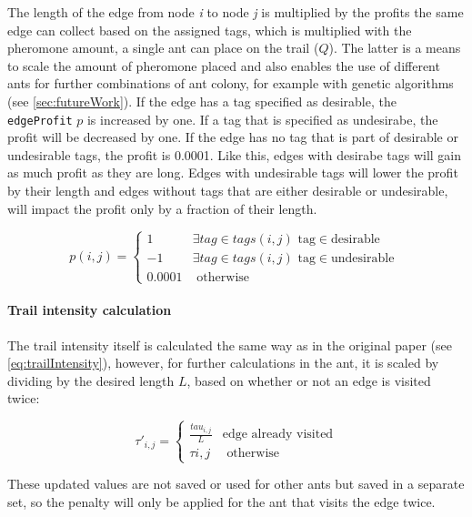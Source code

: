 The length of the edge from node \textit{i} to node \textit{j} is multiplied by the profits the same edge can collect based on the assigned tags, which is multiplied with the pheromone amount, a single ant can place on the trail ($Q$).
The latter is a means to scale the amount of pheromone placed and also enables the use of different ants for further combinations of ant colony, for example with genetic algorithms (see \ref{sec:futureWork}).
If the edge has a tag specified as desirable, the \texttt{edgeProfit} $p$ is increased by one.
If a tag that is specified as undesirabe, the profit will be decreased by one.
If the edge has no tag that is part of desirable or undesirable tags, the profit is 0.0001.
Like this, edges with desirabe tags will gain as much profit as they are long. 
Edges with undesirable tags will lower the profit by their length and edges without tags that are either desirable or undesirable, will impact the profit only by a fraction of their length.

\begin{equation}
	\label{eq:newProfitCalc}
	p(i,j) = \begin{cases}
		1 &\exists tag \in tags(i,j) \text{ tag} \in \text{desirable }\\
		-1 &\exists tag \in tags(i,j) \text{ tag} \in \text{undesirable }\\
		0.0001 &\text{ otherwise}
	\end{cases}
\end{equation}

\paragraph{Trail intensity calculation}

The trail intensity itself is calculated the same way as in the original paper (see \ref{eq:trailIntensity}), however, for further calculations in the ant, it is scaled by dividing by the desired length $L$, based on whether or not an edge is visited twice:

\begin{equation}
	\label{eq:scaledTrailIntensity}
	\tau'_{i,j} = \begin{cases}
		 \frac{tau_{i,j}}{L} &\text{edge already visited}\\
		\tau{i,j} &\text{ otherwise}
	\end{cases}
\end{equation}

These updated values are not saved or used for other ants but saved in a separate set, so the penalty will only be applied for the ant that visits the edge twice.


